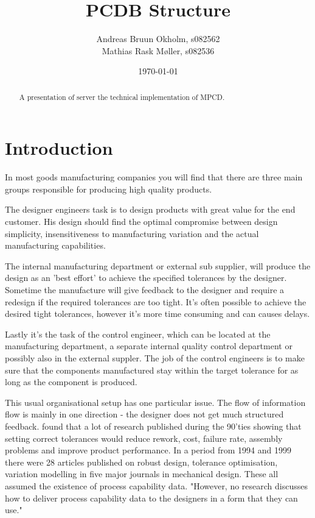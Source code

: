 \documentclass[aip,amsmath,reprint, author-year]{revtex4-1}
\begin{document}
\begin{abstract}
A presentation of server the technical implementation of MPCD.
\end{abstract}

\title{PCDB Structure}
\author{Andreas Bruun Okholm, s082562\\
Mathias Rask Møller, s082536 }  
 
\date{\today}
\maketitle


\section{Introduction}
In most goods manufacturing companies you will find that there are three main groups responsible for producing high quality products.

The designer engineers task is to design products with great value for the end customer. 
His design should find the optimal compromise between design simplicity, insensitiveness to manufacturing variation and the actual manufacturing capabilities. 

The internal manufacturing department or external sub supplier, will produce the design as an 'best effort' to achieve the specified tolerances by the designer. Sometime the manufacture will give feedback to the designer and require a redesign if the required tolerances are too tight. It's often possible to achieve the desired tight tolerances, however it's more time consuming and can causes delays.

Lastly it's the task of the control engineer, which can be located at the manufacturing department, a separate internal quality control department or possibly also in the external suppler. 
The job of the control engineers is to make sure that the components manufactured stay within the target tolerance for as long as the component is produced.

This usual organisational setup has one particular issue. 
The flow of information flow is mainly in one direction - the designer does not get much structured feedback. \citet{tata1999process} found that a lot of research published during the 90'ties showing that setting correct tolerances would reduce rework, cost, failure rate, assembly problems and improve product performance. 
In a period from 1994 and 1999 there were 28 articles published on robust design, tolerance optimisation, variation modelling in five major journals in mechanical design. 
These all assumed the existence of process capability data. 
"However, no research discusses how to deliver process capability data to the designers in a form that they can use." \cite{tata1999process}
\end{document}
